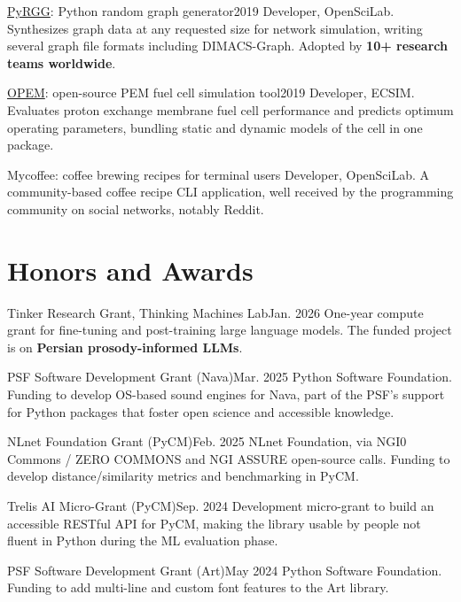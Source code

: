   \cventry
    {\href{https://github.com/sepandhaghighi/pyrgg}{PyRGG}: Python random graph generator}{2019}
    {Developer, OpenSciLab. Synthesizes graph data at any requested size for network simulation, writing several graph file formats including DIMACS-Graph. Adopted by \textbf{10+ research teams worldwide}.}

  \cventry
    {\href{https://github.com/ECSIM/opem}{OPEM}: open-source PEM fuel cell simulation tool}{2019}
    {Developer, ECSIM. Evaluates proton exchange membrane fuel cell performance and predicts optimum operating parameters, bundling static and dynamic models of the cell in one package.}

  \cventry
    {Mycoffee: coffee brewing recipes for terminal users}{}
    {Developer, OpenSciLab. A community-based coffee recipe CLI application, well received by the programming community on social networks, notably Reddit.}

\resumeSubHeadingListEnd

\section{Honors and Awards}
\resumeSubHeadingListStart

  \cventry
    {Tinker Research Grant, Thinking Machines Lab}{Jan. 2026}
    {One-year compute grant for fine-tuning and post-training large language models. The funded project is on \textbf{Persian prosody-informed LLMs}.}

  \cventry
    {PSF Software Development Grant (Nava)}{Mar. 2025}
    {Python Software Foundation. Funding to develop OS-based sound engines for Nava, part of the PSF's support for Python packages that foster open science and accessible knowledge.}

  \cventry
    {NLnet Foundation Grant (PyCM)}{Feb. 2025}
    {NLnet Foundation, via NGI0 Commons / ZERO COMMONS and NGI ASSURE open-source calls. Funding to develop distance/similarity metrics and benchmarking in PyCM.}

  \cventry
    {Trelis AI Micro-Grant (PyCM)}{Sep. 2024}
    {Development micro-grant to build an accessible RESTful API for PyCM, making the library usable by people not fluent in Python during the ML evaluation phase.}

  \cventry
    {PSF Software Development Grant (Art)}{May 2024}
    {Python Software Foundation. Funding to add multi-line and custom font features to the Art library.}

